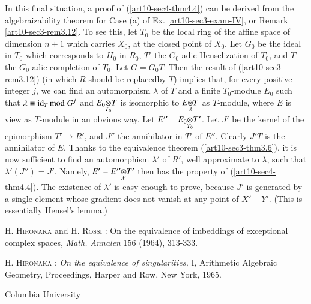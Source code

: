 In this final situation, a proof of (\ref{art10-sec4-thm4.4}) can be derived from the algebraizability theorem for Case (a) of Ex. \ref{art10-sec3-exam-IV}, or Remark \ref{art10-sec3-rem3.12}. To see this, let $T_{0}$ be the local ring of the affine space of dimension $n+1$ which carries $X_{0}$, at the closed point of $X_{0}$. Let $G_{0}$ be the ideal in $T_{0}$ which corresponds to $H_{0}$ in $R_{0}$, $T'$ the $G_{0}$-adic Henselization of $T_{0}$, and $T$ the $G_{0}$-adic completion of $T_{0}$. Let $G=G_{0}T$. Then the result of (\ref{art10-sec3-rem3.12}) (in which $R$ should be replaced\pageoriginale by $T$) implies that, for every positive integer $j$, we can find an automorphism $\lambda$ of $T$ and a finite $T_{0}$-module $E_{0}$ such that $\lambda\equiv\operatorname{\mathrm{id}}_{T}{\rm{mod}}\kern.3em G^{j}$ and $\foprod{E_{0}}{T}{T_{0}}$ is isomorphic to $\foprod{E}{T}{\lambda}$ as $T$-module, where $E$ is view as $T$-module in an obvious way. Let $E''=\foprod{E_{0}}{T'}{T_{0}}$. Let $J'$ be the kernel of the epimorphism $T'\to R'$, and $J''$ the annihilator in $T'$ of $E''$. Clearly $J'T$ is the annihilator of $E$. Thanks to the equivalence theorem (\ref{art10-sec3-thm3.6}), it is now sufficient to find an automorphism $\lambda'$ of $R'$, well approximate to $\lambda$, such that $\lambda'(J'')=J'$. Namely, $E'=\foprod{E''}{T'}{\lambda'}$ then has the property of (\ref{art10-sec4-thm4.4}). The existence of $\lambda'$ is easy enough to prove, because $J'$ is generated by a single element whose gradient does not vanish at any point of $X'-Y'$. (This is essentially Hensel's lemma.)

\begin{thebibliography}{99}
 \textsc{H. Hironaka} and \textsc{H. Rossi :} On the equivalence of imbeddings of exceptional complex spaces, {\em Math. Annalen} 156 (1964), 313-333.

 \textsc{H. Hironaka :} {\em On the equivalence of singularities,} I, Arithmetic Algebraic Geometry, Proceedings, Harper and Row, New York, 1965.
\end{thebibliography}

\bigskip
\noindent
{\small Columbia University}
